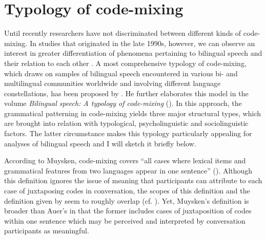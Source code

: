 \section{Typology of code-mixing}
Until recently researchers have not discriminated between different kinds of code-mixing. In studies that originated in the late 1990s, however, we can observe an interest in greater differentiation of phenomena pertaining to bilingual speech and their relation to each other \citep[cf.][]{auer-codeswitching-1999}. A most comprehensive typology of code-mixing, which draws on samples of bilingual speech encountered in various bi- and multilingual communities worldwide and involving different language constellations, has been proposed by \citet{muysken-code-switching-1997}. He further elaborates this model in the volume \textit{Bilingual speech: A typology of code-mixing} (\citeyear{muysken-bilingual-2000}). In this approach, the grammatical patterning in code-mixing yields three major structural types, which are brought into relation with typological, psycholinguistic and sociolinguistic factors. The latter circumstance makes this typology particularly appealing for analyses of bilingual speech and I will sketch it briefly below.

According to Muysken, code-mixing covers ``all cases where lexical items and grammatical features from two languages appear in one sentence'' (\citeyear[][1]{muysken-bilingual-2000}). Although this definition ignores the issue of meaning that participants can attribute to each case of juxtaposing codes in conversation, the scopes of this definition and the definition given by \citet{auer-codeswitching-1999} seem to roughly overlap (cf. ). Yet, Muysken's definition is broader than Auer's in that the former includes cases of juxtaposition of codes within one sentence which may be perceived and interpreted by conversation participants as meaningful.

